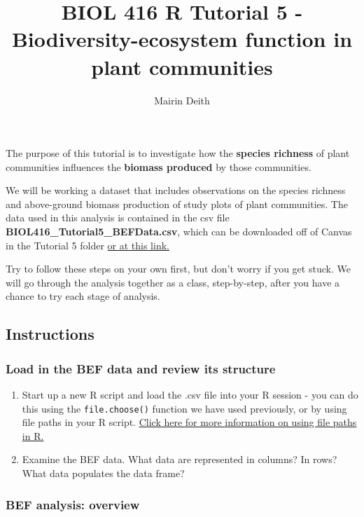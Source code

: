 \documentclass[]{article}
\title{BIOL 416 R Tutorial 5 - Biodiversity-ecosystem function in plant
communities}
\author{Mairin Deith}
\date{}
\begin{document}
\maketitle

{
\setcounter{tocdepth}{2}
\tableofcontents
}
The purpose of this tutorial is to investigate how the \textbf{species
richness} of plant communities influences the \textbf{biomass produced}
by those communities.

We will be working a dataset that includes observations on the species
richness and above-ground biomass production of study plots of plant
communities. The data used in this analysis is contained in the csv file
\textbf{BIOL416\_Tutorial5\_BEFData.csv}, which can be downloaded off of
Canvas in the Tutorial 5 folder
\href{https://canvas.ubc.ca/users/198718/files/3931377}{or at this
link.}

Try to follow these steps on your own first, but don't worry if you get
stuck. We will go through the analysis together as a class,
step-by-step, after you have a chance to try each stage of analysis.

\subsection{Instructions}\label{instructions}

\subsubsection{Load in the BEF data and review its
structure}\label{load-in-the-bef-data-and-review-its-structure}

\begin{enumerate}
\def\labelenumi{\arabic{enumi}.}
\item
  Start up a new R script and load the .csv file into your R session -
  you can do this using the \texttt{file.choose()} function we have used
  previously, or by using file paths in your R script.
  \href{http://rfunction.com/archives/1001}{Click here for more
  information on using file paths in R.}
\item
  Examine the BEF data. What data are represented in columns? In rows?
  What data populates the data frame?
\end{enumerate}

\subsubsection{BEF analysis: overview}\label{bef-analysis-overview}
\end{document}

